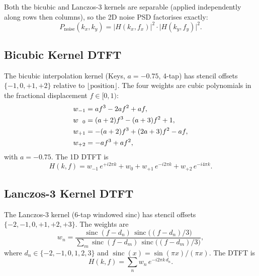 \documentclass[11pt,a4paper]{article}
\newcommand{\Pnoise}{P_\mathrm{noise}}
\begin{document}
Both the bicubic and Lanczos-3 kernels are separable (applied independently along rows then columns), so the 2D noise PSD factorises exactly:
%
\begin{equation}
    \Pnoise(k_x, k_y) = \lvert H(k_x, f_x) \rvert^2 \cdot \lvert H(k_y, f_y) \rvert^2.
    \label{eq:pnoise_2d}
\end{equation}

\subsection{Bicubic Kernel DTFT}

The bicubic interpolation kernel (Keys, $a = -0.75$, 4-tap) has stencil offsets $\{-1, 0, +1, +2\}$ relative to $\lfloor\text{position}\rfloor$.
The four weights are cubic polynomials in the fractional displacement $f \in [0, 1)$:
%
\begin{align}
    w_{-1} &= a f^3 - 2a f^2 + a f, \notag \\
    w_{\phantom{-}0} &= (a+2) f^3 - (a+3) f^2 + 1, \notag \\
    w_{+1} &= -(a+2) f^3 + (2a+3) f^2 - a f, \label{eq:bicubic_weights} \\
    w_{+2} &= -a f^3 + a f^2, \notag
\end{align}
%
with $a = -0.75$.
The 1D DTFT is
%
\begin{equation}
    H(k, f) = w_{-1}\, e^{+i2\pi k} + w_0 + w_{+1}\, e^{-i2\pi k} + w_{+2}\, e^{-i4\pi k}.
    \label{eq:bicubic_dtft}
\end{equation}

\subsection{Lanczos-3 Kernel DTFT}

The Lanczos-3 kernel (6-tap windowed sinc) has stencil offsets $\{-2, -1, 0, +1, +2, +3\}$.
The weights are
%
\begin{equation}
    w_n = \frac{\operatorname{sinc}(f - d_n)\,\operatorname{sinc}\!\bigl((f - d_n)/3\bigr)}{\displaystyle\sum_m \operatorname{sinc}(f - d_m)\,\operatorname{sinc}\!\bigl((f - d_m)/3\bigr)},
    \label{eq:lanczos_weights}
\end{equation}
%
where $d_n \in \{-2, -1, 0, 1, 2, 3\}$ and $\operatorname{sinc}(x) = \sin(\pi x)/(\pi x)$.
The DTFT is
%
\begin{equation}
    H(k, f) = \sum_n w_n\, e^{-i2\pi k\, d_n}.
    \label{eq:lanczos_dtft}
\end{equation}
\end{document}
